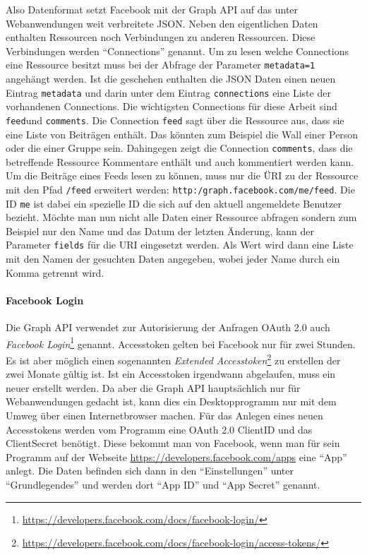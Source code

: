 Also Datenformat setzt Facebook mit der Graph API auf das unter Webanwendungen weit verbreitete JSON. Neben den eigentlichen Daten enthalten Ressourcen noch Verbindungen zu anderen Ressourcen. Diese Verbindungen werden \enquote{Connections} genannt. Um zu lesen welche Connections eine Ressource besitzt muss bei der Abfrage der Parameter \texttt{metadata=1} angehängt werden. Ist die geschehen enthalten die JSON Daten einen neuen Eintrag \texttt{metadata} und darin unter dem Eintrag \texttt{connections} eine Liste der vorhandenen Connections. Die wichtigsten Connections für diese Arbeit sind \texttt{feed}und \texttt{comments}. Die Connection \texttt{feed} sagt über die Ressource aus, dass sie eine Liste von Beiträgen enthält. Das könnten zum Beispiel die Wall einer Person oder die einer Gruppe sein. Dahingegen zeigt die Connection \texttt{comments}, dass die betreffende Ressource Kommentare enthält und auch kommentiert werden kann. Um die Beiträge eines Feeds lesen zu können, muss nur die ÜRI zu der Ressource mit den Pfad \texttt{/feed} erweitert werden: \texttt{http:/graph.facebook.com/me/feed}. Die ID \texttt{me} ist dabei ein spezielle ID die sich auf den aktuell angemeldete Benutzer bezieht. Möchte man nun nicht alle Daten einer Ressource abfragen sondern zum Beispiel nur den Name und das Datum der letzten Änderung, kann der Parameter \texttt{fields} für die URI eingesetzt werden. Als Wert wird dann eine Liste mit den Namen der gesuchten Daten angegeben, wobei jeder Name durch ein Komma getrennt wird. 


\paragraph{Facebook Login} %
\label{par:facebook_login}

Die Graph API verwendet zur Autorisierung der Anfragen OAuth 2.0 auch \emph{Facebook Login}\footnote{\url{https://developers.facebook.com/docs/facebook-login/}} genannt. Accesstoken gelten bei Facebook nur für zwei Stunden. Es ist aber möglich einen sogenannten \emph{Extended Accesstoken}\footnote{\url{https://developers.facebook.com/docs/facebook-login/access-tokens/}} zu erstellen der zwei Monate gültig ist. Ist ein Accesstoken irgendwann abgelaufen, muss ein neuer erstellt werden. Da aber die Graph API hauptsächlich nur für Webanwendungen gedacht ist, kann dies ein Desktopprogramm nur mit dem Umweg über einen Internetbrowser machen. Für das Anlegen eines neuen Accesstokens werden vom Programm eine OAuth 2.0 ClientID und das ClientSecret benötigt. Diese bekommt man von Facebook, wenn man für sein Programm auf der Webseite \url{https://developers.facebook.com/apps} eine \enquote{App} anlegt. Die Daten befinden sich dann in den \enquote{Einstellungen} unter \enquote{Grundlegendes} und werden dort \enquote{App ID} und \enquote{App Secret} genannt.

